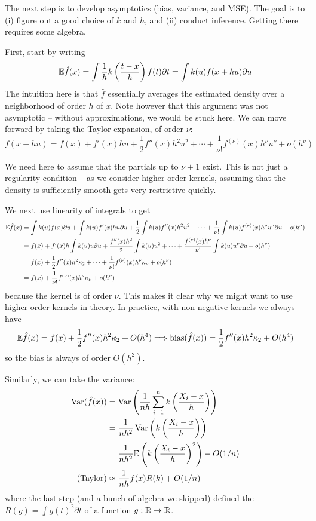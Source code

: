 \documentclass[10pt]{article}
\begin{document}
\begin{remark}
	The next step is to develop asymptotics (bias, variance, and MSE). The goal is to (i) figure out a good choice of $k$ and $h$, and (ii) conduct inference. Getting there requires some algebra.
\end{remark}

First, start by writing
\[
	\mathbb{E} \hat{f}(x) = \int \frac{1}{h}k\left( \frac{t-x}{h}\right) f(t)\partial t = \int k(u) f(x+hu)\partial u
\]
The intuition here is that $\hat{f}$ essentially averages the estimated density over a neighborhood of order $h$ of $x$. Note however that this argument was not asymptotic -- without approximations, we would be stuck here. We can move forward by taking the Taylor expansion, of order $\nu$:
\[
f(x+hu) = f(x) + f'(x)hu + \frac{1}{2} f''(x)h^2u^2 + \cdots + \frac{1}{\nu!} f^{(\nu)}(x)h^\nu u^\nu + o(h^\nu)
\]
\begin{remark}
	We need here to assume that the partials up to $\nu + 1$ exist. This is not just a regularity condition -- as we consider higher order kernels, assuming that the density is sufficiently smooth gets very restrictive quickly. 
\end{remark}
We next use linearity of integrals to get
\begin{align*}
	\mathbb{E} \hat{f}(x) &= \int k(u) f(x) \partial u + \int k(u) f'(x)hu \partial u + \frac{1}{2} \int k(u) f''(x)h^2u^2 + \cdots+ \frac{1}{\nu!} \int k(u) f^{(\nu)}(x)h^\nu u^\nu\partial u+ o(h^\nu) \\
	 &= f(x) + f'(x)h\int k(u)u \partial u + \frac{f''(x)h^2 }{2}\int k(u) u^2 + \cdots + \frac{f^{(\nu)}(x)h^\nu}{\nu!} \int k(u)  u^\nu\partial u+ o(h^\nu) \\
	 &= f(x) + \frac{1}{2} f''(x)h^2\kappa_2 + \cdots + \frac{1}{\nu!}f^{(\nu)}(x)h^\nu\kappa_\nu +  o(h^\nu) \\
	 &= f(x) +  \frac{1}{\nu!}f^{(\nu)}(x)h^\nu\kappa_\nu +  o(h^\nu)
\end{align*}
because the kernel is of order $\nu$. This makes it clear why we might want to use higher order kernels in theory. In practice, with non-negative kernels we always have
\[\mathbb{E} \hat{f}(x) = f(x) + \frac{1}{2}f''(x) h^2\kappa_2 + O(h^4) \Longrightarrow \mathop{\rm bias}(\hat{f}(x)) = \frac{1}{2}f''(x) h^2\kappa_2 + O(h^4)\]so the bias is always of order $O(h^2)$. 

Similarly, we can take the variance:
\begin{align*}
	\mathop{\rm Var}(\hat{f}(x)) &= \mathop{\rm Var}\left( \frac{1}{nh} \sum_{i=1}^n k\left( \frac{X_i-x}{h}\right) \right) \\
	&= \frac{1}{nh^2} \mathop{\rm Var} \left( k\left( \frac{X_i-x}{h}\right) \right) \\ 
	&= \frac{1}{nh^2} \mathbb{E} \left(  k\left( \frac{X_i-x}{h}\right)^2 \right) - O(1/n) \\
	\text{(Taylor)} &\approx \frac{1}{nh}f(x)R(k) + O(1/n)
\end{align*}
where the last step (and a bunch of algebra we skipped) defined the  $R(g) = \int g(t)^2\partial t$ of a function $g: \mathbb{R} \to \mathbb{R}$. 
\end{document}
